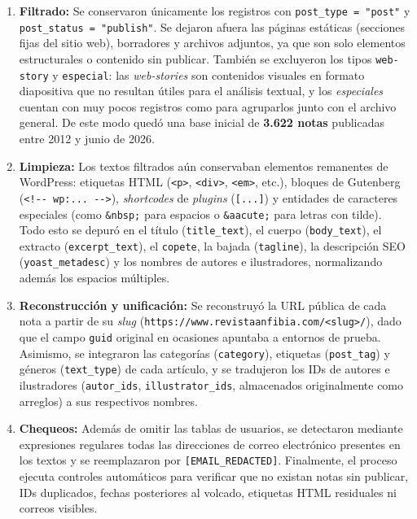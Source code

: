 \documentclass[
]{article}
\begin{document}
\begin{enumerate}
\def\labelenumi{\arabic{enumi}.}
\item
  \textbf{Filtrado:} Se conservaron únicamente los registros con
  \texttt{post\_type\ =\ "post"} y \texttt{post\_status\ =\ "publish"}.
  Se dejaron afuera las páginas estáticas (secciones fijas del sitio
  web), borradores y archivos adjuntos, ya que son solo elementos
  estructurales o contenido sin publicar. También se excluyeron los
  tipos \texttt{web-story} y \texttt{especial}: las \emph{web-stories}
  son contenidos visuales en formato diapositiva que no resultan útiles
  para el análisis textual, y los \emph{especiales} cuentan con muy
  pocos registros como para agruparlos junto con el archivo general. De
  este modo quedó una base inicial de \textbf{3.622 notas} publicadas
  entre 2012 y junio de 2026.
\item
  \textbf{Limpieza:} Los textos filtrados aún conservaban elementos
  remanentes de WordPress: etiquetas HTML
  (\texttt{\textless{}p\textgreater{}},
  \texttt{\textless{}div\textgreater{}},
  \texttt{\textless{}em\textgreater{}}, etc.), bloques de Gutenberg
  (\texttt{\textless{}!-\/-\ wp:...\ -\/-\textgreater{}}),
  \emph{shortcodes} de \emph{plugins} (\texttt{{[}...{]}}) y entidades
  de caracteres especiales (como \texttt{\&nbsp;} para espacios o
  \texttt{\&aacute;} para letras con tilde). Todo esto se depuró en el
  título (\texttt{title\_text}), el cuerpo (\texttt{body\_text}), el
  extracto (\texttt{excerpt\_text}), el \texttt{copete}, la bajada
  (\texttt{tagline}), la descripción SEO (\texttt{yoast\_metadesc}) y
  los nombres de autores e ilustradores, normalizando además los
  espacios múltiples.
\item
  \textbf{Reconstrucción y unificación:} Se reconstruyó la URL pública
  de cada nota a partir de su \emph{slug}
  (\texttt{https://www.revistaanfibia.com/\textless{}slug\textgreater{}/}),
  dado que el campo \texttt{guid} original en ocasiones apuntaba a
  entornos de prueba. Asimismo, se integraron las categorías
  (\texttt{category}), etiquetas (\texttt{post\_tag}) y géneros
  (\texttt{text\_type}) de cada artículo, y se tradujeron los IDs de
  autores e ilustradores (\texttt{autor\_ids},
  \texttt{illustrator\_ids}, almacenados originalmente como arreglos) a
  sus respectivos nombres.
\item
  \textbf{Chequeos:} Además de omitir las tablas de usuarios, se
  detectaron mediante expresiones regulares todas las direcciones de
  correo electrónico presentes en los textos y se reemplazaron por
  \texttt{{[}EMAIL\_REDACTED{]}}. Finalmente, el proceso ejecuta
  controles automáticos para verificar que no existan notas sin
  publicar, IDs duplicados, fechas posteriores al volcado, etiquetas
  HTML residuales ni correos visibles.
\end{enumerate}
\end{document}
